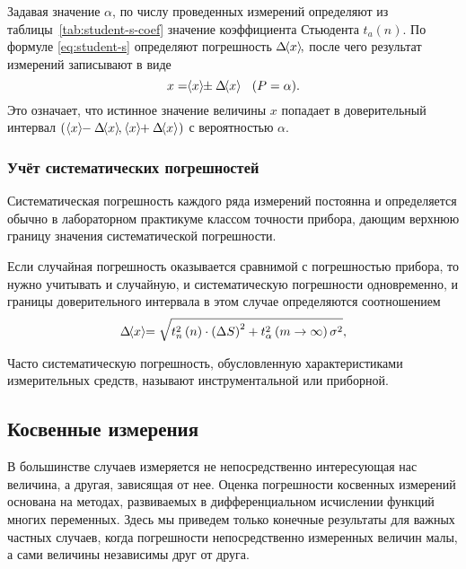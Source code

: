 \documentclass[a4paper, 12pt]{extarticle}
\begin{document}
Задавая значение $\alpha$, по числу проведенных измерений определяют
из таблицы~\ref{tab:student-s-coef} значение коэффициента Стьюдента $t_a(n)$. По формуле
\eqref{eq:student-s} определяют погрешность $\Delta \hspace{-3pt}\left<x\right>\hspace{-3pt},$ после чего результат измерений
записывают в виде
\begin{equation}
    \label{eq:result-with-students}
    x = \hspace{-3pt}\left<x\right>\hspace{-3pt} \pm \Delta \hspace{-3pt}\left<x\right>\hspace{-3pt} \quad (P = \alpha).
\end{equation}
Это означает, что истинное значение величины $x$ попадает в доверительный интервал $\left(\  \MTDMean{x} - \Delta \MTDMean{x},\ \MTDMean{x} + \Delta \MTDMean{x}\ \right)$ с вероятностью $\alpha$.

\subsubsection{Учёт систематических погрешностей}
Систематическая погрешность каждого ряда измерений постоянна и определяется обычно в лабораторном практикуме классом точности прибора, дающим верхнюю границу значения систематической погрешности.

Если случайная погрешность оказывается сравнимой с погрешностью прибора, то нужно учитывать и случайную, и систематическую погрешности одновременно, и границы доверительного интервала в этом случае определяются соотношением
\begin{equation}
    \label{eq:interval-with-systematic-error}
    \Delta \hspace{-3pt}\left<x\right>\hspace{-3pt} = \sqrt{t^2_n \left(n\right) \cdot \left(\Delta S\right)^2 + t^2_{\alpha} \left(m \to \infty\right)\sigma^2},
\end{equation}

Часто систематическую погрешность, обусловленную характеристиками измерительных средств, называют инструментальной или приборной.

\subsection{Косвенные измерения}

В большинстве случаев измеряется не непосредственно интересующая нас величина, а другая, зависящая от нее. Оценка погрешности косвенных измерений основана на методах, развиваемых в дифференциальном исчислении функций многих переменных. Здесь мы приведем только конечные результаты для важных частных случаев, когда погрешности непосредственно измеренных величин малы, а сами величины независимы друг от друга.
\end{document}
